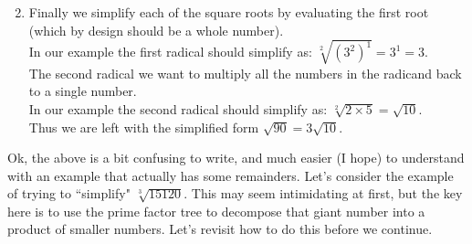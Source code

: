 \documentclass{ximeraXloud}
\begin{document}
\begin{enumerate}
\[        \]
        \item Finally we simplify each of the square roots by evaluating the first root (which by design should be a whole number). \\
        In our example the first radical should simplify as: $\sqrt[2]{(3^2)^1} = 3^1 = 3$. \\
        The second radical we want to multiply all the numbers in the radicand back to a single number.\\
        In our example the second radical should simplify as: $\sqrt[2]{2 \times 5} = \sqrt{10}$. \\
        Thus we are left with the simplified form $\sqrt{90} = 3 \sqrt{10}$.
    \end{enumerate}

    Ok, the above is a bit confusing to write, and much easier (I hope) to understand with an example that actually has some remainders. Let's consider the example of trying to ``simplify" $\sqrt[3]{15120}$. This may seem intimidating at first, but the key here is to use the prime factor tree to decompose that giant number into a product of smaller numbers. Let's revisit how to do this before we continue.

    
\end{document}
